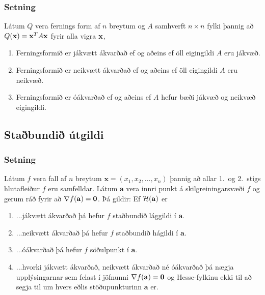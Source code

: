 
\subsubsection{Setning  }
 Látum $Q$ vera fernings form  af $n$ breytum og
$A$ samhverft $n\times n$ fylki þannig að $Q(\mbox{${\bf x}$})=\mbox{${\bf x}$}^TA\mbox{${\bf x}$}$ fyrir
alla vigra $\mbox{${\bf x}$}$,
\begin {enumerate}
 \item  Ferningsformið er jákvætt ákvarðað ef og aðeins ef öll eigingildi
    $A$ eru jákvæð.
\item Ferningsformið er neikvætt ákvarðað ef og aðeins ef öll eigingildi
    $A$ eru neikvæð.
\item  Ferningsformið er óákvarðað ef og aðeins ef $A$ hefur bæði jákvæð
     og neikvæð eigingildi.	
\end {enumerate}






\subsection{Staðbundið útgildi} 

\subsubsection{Setning  }
 Látum $f$ vera fall af $n$ breytum $\mathbf{x} = (x_1,x_2,\ldots,x_n)$ þannig að allar
1.~og 2.~stigs hlutafleiður $f$ eru samfelldar.  Látum $\mathbf{a}$ vera
innri punkt á skilgreiningarsvæði $f$ og gerum ráð fyrir að $\nabla
f(\mathbf{a})=\mbox{${\bf 0}$}$.  Þá gildir: Ef ${\cal H}(\mathbf{a})$ er 
\begin {enumerate}
 \item  ...jákvætt ákvarðað þá hefur $f$ staðbundið
     lággildi í $\mathbf{a}$.
\item ...neikvætt ákvarðað þá hefur $f$ staðbundið
     hágildi í $\mathbf{a}$.
\item    ...óákvarðað þá hefur $f$ söðulpunkt í
      $\mathbf{a}$.  
\item ...hvorki jákvætt ákvarðað, neikvætt ákvarðað
      né óákvarðað þá nægja upplýsingarnar sem felast í jöfnunni
      $\nabla f(\mathbf{a})=\mbox{${\bf 0}$}$ og Hesse-fylkinu ekki til að segja til um
      hvers eðlis stöðupunkturinn $\mathbf{a}$ er.
\end {enumerate}






